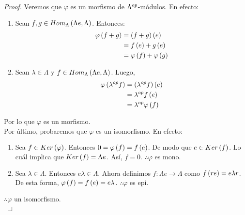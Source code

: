 \documentclass{article}
\begin{document}
\begin{enumerate}[label=\textbf{Ej \arabic*.}]
\begin{proof}
		Veremos que $\varphi$ es un morfismo de ${\Lambda}^{op}$-módulos. En efecto:
		\begin{enumerate}
			\item Sean $f,g\in Hom_{\Lambda}\left(\Lambda e,\Lambda\right)$. Entonces:
			\begin{align*}
				\varphi\left(f+g\right)&=\left(f+g\right)\left(e\right)\\
				&=f\left(e\right)+g\left(e\right)\\
				&=\varphi\left(f\right)+\varphi\left(g\right)
			\end{align*}
			\item Sean $\lambda\in\Lambda$ y $f\in Hom_{\Lambda}\left(\Lambda e,\Lambda\right)$. Luego,
			\begin{align*}
				\varphi\left({\lambda}^{op}f\right)&=\left({\lambda}^{op}f\right)\left(e\right)\\
				&={\lambda}^{op}f\left(e\right)\\
				&={\lambda}^{op}\varphi\left(f\right)
			\end{align*}
		\end{enumerate}
		Por lo que $\varphi$ es un morfismo.\\
		
		Por último, probaremos que $\varphi$ es un isomorfismo. En efecto:
		\begin{enumerate}
			\item Sea $f \in Ker\left(\varphi\right)$. Entonces $0=\varphi\left(f\right)=f\left(e\right)$. De modo que $e \in Ker\left(f\right)$. Lo cuál implica que $Ker\left(f\right)=\Lambda e$. Así, $f=0$. $\therefore\varphi$ es mono.
			\item Sea $\lambda \in \Lambda$. Entonces $e\lambda\in\Lambda$. Ahora definimos $f:\Lambda e \longrightarrow\Lambda$ como $f\left(re\right)=e\lambda r$. De esta forma, $\varphi\left(f\right)=f\left(e\right)=e\lambda$. $\therefore\varphi$ es epi.
		\end{enumerate}
		$\therefore\varphi$ un isomorfismo.\\
		

\end{proof}
\end{enumerate}
\end{document}
